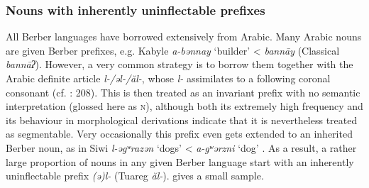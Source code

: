 \documentclass[output=paper]{langscibook}
\begin{document}
\subsubsection{Nouns with inherently uninflectable prefixes} %
\begin{styleStandarduser}
All Berber languages have borrowed extensively from Arabic. Many Arabic nouns are given Berber prefixes, e.g. Kabyle \textit{a-bənnay} ‘builder’ < \textit{bannāy} (Classical \textit{bannāʔ}). However, a very common strategy is to borrow them together with the Arabic definite article \textit{l-/əl-/ăl-}, whose \textit{l-} assimilates to a following coronal consonant (cf. \citealt{Kossmann2013}: 208). This is then treated as an invariant prefix with no semantic interpretation (glossed here as \textsc{n}), although both its extremely high frequency and its behaviour in morphological derivations indicate that it is nevertheless treated as segmentable. Very occasionally this prefix even gets extended to an inherited Berber noun, as in Siwi \textit{l-əgʷrazən} ‘dogs’ < \textit{a-gʷərzni} ‘dog’ \citep[76]{Souag2013}. As a result, a rather large proportion of nouns in any given Berber language start with an inherently uninflectable prefix \textit{(ə)l-} (Tuareg \textit{ăl-}).  gives a small sample.
\end{styleStandarduser}

\begin{styleLangsciTableHeading}%
\begin{table}
\caption{Some loans with the Arabic article}
\label{tab:key:7}
\end{table}\end{styleLangsciTableHeading}
\end{document}
